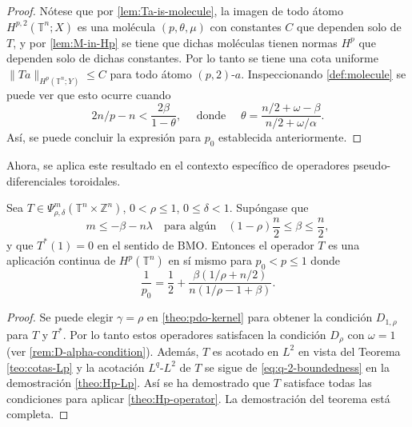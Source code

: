\begin{proof}
	Nótese que por \cref{lem:Ta-is-molecule}, la imagen de todo átomo $H^{p,2}(\mathbb{T}^n;X)$ es una molécula $(p, \theta,\mu)$ con constantes $C$ que dependen solo de $T$, y por \cref{lem:M-in-Hp} se tiene que dichas moléculas tienen normas $H^p$ que dependen solo de dichas constantes. Por lo tanto se tiene una cota uniforme $\|Ta\|_{H^p(\mathbb{T}^n;Y)}\leq C$ para todo átomo $(p,2)$-$a$. Inspeccionando \cref{def:molecule} se puede ver que esto ocurre cuando 
	\begin{equation*}
		2n/p -n < \frac{2\beta}{1-\theta}, \quad \text{ donde } \quad \theta = \frac{n/2+\omega-\beta}{n/2+\omega/\alpha}.
	\end{equation*}
	Así, se puede concluir la expresión para $p_0$ establecida anteriormente.
\end{proof}
Ahora, se aplica este resultado en el contexto específico de operadores pseudo-diferenciales toroidales.
\begin{theorem}
	Sea $T\in \Psi^m_{\rho,\delta}(\mathbb{T}^n\times\mathbb{Z}^n)$, $0<\rho\leq1$, $0\leq\delta<1$. Supóngase que
	\begin{equation}
		m\leq-\beta-n\lambda \quad  \text{para algún} \quad (1-\rho)\frac{n}{2}\leq\beta\leq \frac{n}{2}, 
	\end{equation}
	y que $T^*(1)=0$ en el sentido de BMO. Entonces el operador $T$ es una aplicación continua de $H^p(\mathbb{T}^n)$ en sí mismo para $p_0<p\leq1$ donde 
	\begin{equation}
		\frac{1}{p_0} = \frac{1}{2}+\frac{\beta(1/\rho + n/2)}{n(1/\rho-1+\beta)}.
	\end{equation}
\end{theorem}
\begin{proof}
	Se puede elegir $\gamma =\rho$ en \cref{theo:pdo-kernel} para obtener la condición $D_{1,\rho}$ para $T$ y $T^*$. Por lo tanto estos operadores satisfacen la condición $D_\rho$  con $\omega=1$ (ver \cref{rem:D-alpha-condition}). Además, $T$ es acotado en $L^2$ en vista del Teorema \ref{teo:cotas-Lp} y la acotación $L^q$-$L^2$ de $T$ se sigue de \cref{eq:q-2-boundedness} en la demostración \cref{theo:Hp-Lp}. Así se ha demostrado que $T$ satisface todas las condiciones para aplicar \cref{theo:Hp-operator}. La demostración del teorema está completa.
\end{proof}

